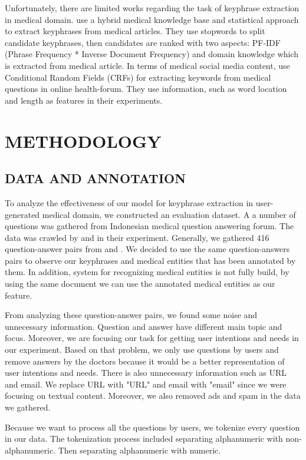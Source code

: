 Unfortunately, there are limited works regarding the task of keyphrase extraction in medical domain. \cite{ekpMedicalDocumentHybrid} use a hybrid medical knowledge base and statistical approach to extract keyphrases from medical articles. They use stopwords to split candidate keyphrases, then candidates are ranked with two aspects: PF-IDF (Phrase Frequency * Inverse Document Frequency) and domain knowledge which is extracted from medical article. In terms of medical social media content, \cite{cao2010automatically} use Conditional Random Fields (CRFs) for extracting keywords from medical questions in online health-forum. They use information, such as word location and length as features in their experiments.

\section{METHODOLOGY}
\subsection{DATA AND ANNOTATION}
To analyze the effectiveness of our model for keyphrase extraction in user-generated medical domain, we constructed an evaluation dataset. A a number of questions was gathered from Indonesian medical question answering forum. The data was crawled by \cite{skripsiKakRadit} and \cite{skripsiWahid} in their experiment. Generally, we gathered 416 question-answer pairs from \cite{skripsiKakRadit} and \cite{skripsiWahid}. We decided to use the same question-answers pairs to observe our keyphrases and medical entities that has been annotated by them. In addition, system for recognizing medical entities is not fully build, by using the same document we can use the annotated medical entities as our feature.

From analyzing these question-answer pairs, we found some noise and unnecessary information. Question and answer have different main topic and focus. Moreover, we are focusing our task for getting user intentions and needs in our experiment. Based on that problem, we only use questions by users and remove answers by the doctors because it would be a better representation of user intentions and needs. There is also unnecessary information such as URL and email. We replace URL with "URL"  and email with "email" since we were focusing on textual content. Moreover, we also removed ads and spam in the data we gathered.

Because we want to process all the questions by users, we tokenize every question in our data. The tokenization process included separating alphanumeric with non-alphanumeric. Then separating alphanumeric with numeric. 

